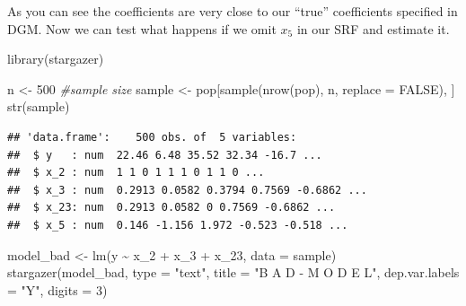 \documentclass[
]{book}
\newenvironment{Shaded}{\begin{snugshade}}{\end{snugshade}}
\newcommand{\AttributeTok}[1]{\textcolor[rgb]{0.77,0.63,0.00}{#1}}
\newcommand{\CommentTok}[1]{\textcolor[rgb]{0.56,0.35,0.01}{\textit{#1}}}
\newcommand{\ConstantTok}[1]{\textcolor[rgb]{0.00,0.00,0.00}{#1}}
\newcommand{\DecValTok}[1]{\textcolor[rgb]{0.00,0.00,0.81}{#1}}
\newcommand{\FunctionTok}[1]{\textcolor[rgb]{0.00,0.00,0.00}{#1}}
\newcommand{\NormalTok}[1]{#1}
\newcommand{\OtherTok}[1]{\textcolor[rgb]{0.56,0.35,0.01}{#1}}
\newcommand{\SpecialCharTok}[1]{\textcolor[rgb]{0.00,0.00,0.00}{#1}}
\newcommand{\StringTok}[1]{\textcolor[rgb]{0.31,0.60,0.02}{#1}}
\begin{document}
As you can see the coefficients are very close to our ``true'' coefficients specified in DGM. Now we can test what happens if we omit \(x_5\) in our SRF and estimate it.

\begin{Shaded}
\begin{Highlighting}[]
\FunctionTok{library}\NormalTok{(stargazer)}

\NormalTok{n }\OtherTok{\textless{}{-}} \DecValTok{500} \CommentTok{\#sample size}
\NormalTok{sample }\OtherTok{\textless{}{-}}\NormalTok{ pop[}\FunctionTok{sample}\NormalTok{(}\FunctionTok{nrow}\NormalTok{(pop), n, }\AttributeTok{replace =} \ConstantTok{FALSE}\NormalTok{), ]}
\FunctionTok{str}\NormalTok{(sample)}
\end{Highlighting}
\end{Shaded}

\begin{verbatim}
## 'data.frame':    500 obs. of  5 variables:
##  $ y   : num  22.46 6.48 35.52 32.34 -16.7 ...
##  $ x_2 : num  1 1 0 1 1 1 0 1 1 0 ...
##  $ x_3 : num  0.2913 0.0582 0.3794 0.7569 -0.6862 ...
##  $ x_23: num  0.2913 0.0582 0 0.7569 -0.6862 ...
##  $ x_5 : num  0.146 -1.156 1.972 -0.523 -0.518 ...
\end{verbatim}

\begin{Shaded}
\begin{Highlighting}[]
\NormalTok{model\_bad }\OtherTok{\textless{}{-}} \FunctionTok{lm}\NormalTok{(y }\SpecialCharTok{\textasciitilde{}}\NormalTok{ x\_2 }\SpecialCharTok{+}\NormalTok{ x\_3 }\SpecialCharTok{+}\NormalTok{ x\_23, }\AttributeTok{data =}\NormalTok{ sample)}
\FunctionTok{stargazer}\NormalTok{(model\_bad, }\AttributeTok{type =} \StringTok{"text"}\NormalTok{, }\AttributeTok{title =} \StringTok{"B A D {-} M O D E L"}\NormalTok{,}
          \AttributeTok{dep.var.labels =} \StringTok{"Y"}\NormalTok{,}
          \AttributeTok{digits =} \DecValTok{3}\NormalTok{)}
\end{Highlighting}
\end{Shaded}
\end{document}
